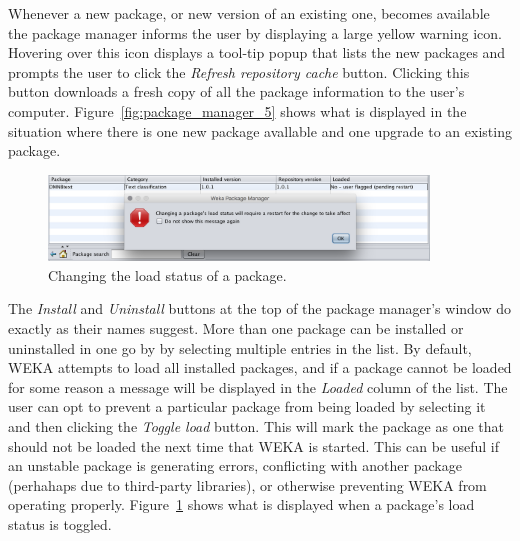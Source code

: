Whenever a new package, or new version of an existing one, becomes
available the package manager informs the user by displaying a large
yellow warning icon. Hovering over this icon displays a tool-tip popup
that lists the new packages and prompts the user to click
the \textit{Refresh repository cache} button. Clicking this button
downloads a fresh copy of all the package information to the user's
computer. Figure~\ref{fig:package_manager_5} shows what is displayed
in the situation where there is one new package avallable and one
upgrade to an existing package.

\begin{figure}[!th]
\centering
\includegraphics[width=0.9\textwidth]{images/P6.png}
\caption{Changing the load status of a package.}
\label{fig:package_manager_6}
\end{figure}

The \textit{Install} and \textit{Uninstall} buttons at the top of the
package manager's window do exactly as their names suggest. More than
one package can be installed or uninstalled in one go by by selecting
multiple entries in the list. By default, WEKA attempts to load all
installed packages, and if a package cannot be loaded for some reason
a message will be displayed in the \textit{Loaded} column of the
list. The user can opt to prevent a particular package from being
loaded by selecting it and then clicking the \textit{Toggle load}
button. This will mark the package as one that should not be loaded
the next time that WEKA is started. This can be useful if an unstable
package is generating errors, conflicting with another package
(perhahaps due to third-party libraries), or otherwise preventing WEKA
from operating properly. Figure~\ref{fig:package_manager_6} shows what
is displayed when a package's load status is toggled.
